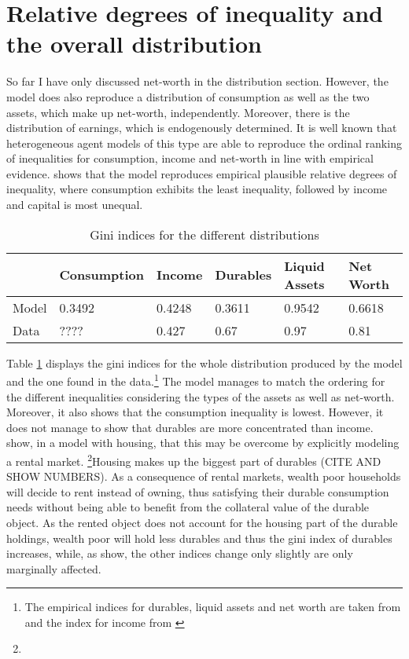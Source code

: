 \documentclass[a4paper,12pt,legno]{article}
\begin{document}
\section{Relative degrees of inequality and the overall distribution}
So far I have only discussed net-worth in the distribution section. However, the model does also reproduce a distribution of consumption as well as the two assets, which make up net-worth, independently. Moreover, there is the distribution of earnings, which is endogenously determined. It is well known that heterogeneous agent models of this type are able to reproduce the ordinal ranking of inequalities for consumption, income and net-worth in line with empirical evidence.\cite{aiyagari1994} shows that the model reproduces empirical plausible relative degrees of inequality, where consumption exhibits the least inequality, followed by income and capital is most unequal. 

\begin{table}[]
\centering
\caption{Gini indices for the different distributions}
\label{Gini_Ranking}
\begin{tabular}{@{}llllll@{}}
\toprule
      & Consumption & Income & Durables & Liquid Assets & Net Worth \\ \midrule
Model & 0.3492      & 0.4248 & 0.3611   & 0.9542        & 0.6618    \\ \midrule
Data  & ????        & 0.427  & 0.67     & 0.97          & 0.81      \\ \bottomrule
\end{tabular}
\end{table}

Table \ref{Gini_Ranking} displays the gini indices for the whole distribution produced by the model and the one found in the data.\footnote{The empirical indices for durables, liquid assets and net worth are taken from \cite{hintermaier2010} and the index for income from \cite{hintermaier2011}} The model manages to match the ordering for the different inequalities considering the types of the assets as well as net-worth. Moreover, it also shows that the consumption inequality is lowest. However, it does not manage to show that durables are more concentrated than income. \cite{diaz2010} show, in a model with housing, that this may be overcome by explicitly modeling a rental market. \footnote{}Housing makes up the biggest part of durables (CITE AND SHOW NUMBERS). As a consequence of rental markets, wealth poor households will decide to rent instead of owning, thus satisfying their durable consumption needs without being able to benefit from the collateral value of the durable object. As the rented object does not account for the housing part of the durable holdings, wealth poor will hold less durables and thus the gini index of durables increases, while, as \cite{diaz2010} show, the other indices change only slightly are only marginally affected. 
\end{document}
